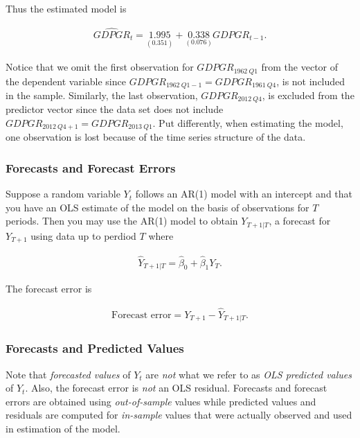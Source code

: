 \documentclass[]{book}
\theoremstyle{definition}
\theoremstyle{definition}
\theoremstyle{definition}
\theoremstyle{remark}
\begin{document}
Thus the estimated model is

\begin{align}
  \widehat{GDPGR}_t = \underset{(0.351)}{1.995} + \underset{(0.076)}{0.338} GDPGR_{t-1} \label{eq:gdpgrar1}.
\end{align}

Notice that we omit the first observation for \(GDPGR_{1962 \ Q1}\) from
the vector of the dependent variable since
\(GDPGR_{1962 \ Q1 - 1} = GDPGR_{1961 \ Q4}\), is not included in the
sample. Similarly, the last observation, \(GDPGR_{2012 \ Q4}\), is
excluded from the predictor vector since the data set does not include
\(GDPGR_{2012 \ Q4 + 1} = GDPGR_{2013 \ Q1}\). Put differently, when
estimating the model, one observation is lost because of the time series
structure of the data.

\subsubsection*{Forecasts and Forecast
Errors}\label{forecasts-and-forecast-errors}

Suppose a random variable \(Y_t\) follows an AR(1) model with an
intercept and that you have an OLS estimate of the model on the basis of
observations for \(T\) periods. Then you may use the AR(1) model to
obtain \(Y_{T+1\vert T}\), a forecast for \(Y_{T+1}\) using data up to
perdiod \(T\) where

\begin{align*}
  \widehat{Y}_{T+1\vert T} = \widehat{\beta}_0 + \widehat{\beta}_1 Y_T.
\end{align*}

The forecast error is

\begin{align*}
  \text{Forecast error} = Y_{T+1} - \widehat{Y}_{T+1\vert T}.
\end{align*}

\subsubsection*{Forecasts and Predicted
Values}\label{forecasts-and-predicted-values}

Note that \emph{forecasted values} of \(Y_t\) are \emph{not} what we
refer to as \emph{OLS predicted values} of \(Y_t\). Also, the forecast
error is \emph{not} an OLS residual. Forecasts and forecast errors are
obtained using \emph{out-of-sample} values while predicted values and
residuals are computed for \emph{in-sample} values that were actually
observed and used in estimation of the model.
\end{document}
